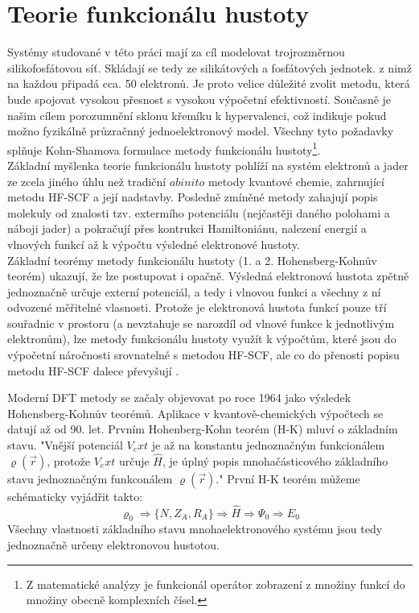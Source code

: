 \documentclass[
  digital, %
  table,   %
  lof,     %
  lot,     %
  oneside,
]{fithesis3}
\begin{document}
\section{Teorie funkcionálu hustoty}
Systémy studované v této práci mají za cíl modelovat trojrozměrnou silikofosfátovou síť. Skládají se tedy ze silikátových a fosfátových jednotek. z nimž na každou připadá cca. 50 elektronů. Je proto velice důležité zvolit metodu, která bude spojovat vysokou přesnost s vysokou výpočetní efektivností. Současně je našim cílem porozumnění sklonu křemíku k hypervalenci, což indikuje pokud možno fyzikálně průzračnný jednoelektronový model. Všechny tyto požadavky splňuje Kohn-Shamova formulace metody funkcionálu hustoty\footnote{Z matematické analýzy je funkcionál operátor zobrazení z množiny funkcí do množiny obecně komplexních čísel.}\cite{bickelhaupt2007kohn}.\\
Základní myšlenka teorie funkcionálu hustoty pohlíží na systém elektronů a jader ze zcela jiného úhlu než tradiční $ab inito$ metody kvantové chemie, zahrnující metodu HF-SCF a její nadstavby. Posledně zmíněné metody zahajují popis molekuly od znalosti tzv. extermího potenciálu (nejčastěji daného polohami  a náboji jader) a pokračují přes kontrukci Hamiltoniánu, nalezení energií a vlnových funkcí až k výpočtu výsledné elektronové hustoty.\\
Základní teorémy metody funkcionálu hustoty (1. a 2. Hohensberg-Kohnův teorém) ukazují, že lze postupovat i opačně. Výsledná elektronová hustota zpětně jednoznačně určuje externí potenciál, a tedy i vlnovou funkci a všechny z ní odvozené měřitelné vlasnosti. Protože je elektronová hustota funkcí pouze tří souřadnic v prostoru (a nevztahuje se narozdíl od vlnové funkce k jednotlivým elektronům), lze metody funkcionálu hustoty využít k výpočtům, které jsou do výpočetní náročnosti srovnatelné s metodou HF-SCF, ale co do přenosti popisu metodu HF-SCF dalece převyšují \cite{jensen2007introduction}.

Moderní DFT metody se začaly objevovat po roce 1964 jako výsledek Hohensberg-Kohnův teorémů. Aplikace v kvantově-chemických výpočtech se datují až od 90. let. Prvním Hohenberg-Kohn teorém (H-K) mluví o základním stavu. "Vnější potenciál  $V_ext$ je až na konstantu jednoznačným funkcionálem $\varrho(\vec{r})$, protože $V_ext$ určuje $\widehat{H}$, je úplný popis mnohačásticového základního stavu jednoznačným funkconálem $\varrho(\vec{r})$."\cite{PhysRev.136.B864} První H-K teorém můžeme schématicky vyjádřit takto:
\begin{equation}
\varrho_0 \Rightarrow \{N, Z_A, R_A\} \Rightarrow \widehat{H} \Rightarrow \Psi_0 \Rightarrow E_0
 \end{equation}
 Všechny vlastnosti základního stavu mnohaelektronového systému jsou tedy jednoznačně určeny elektronovou hustotou.
\end{document}
